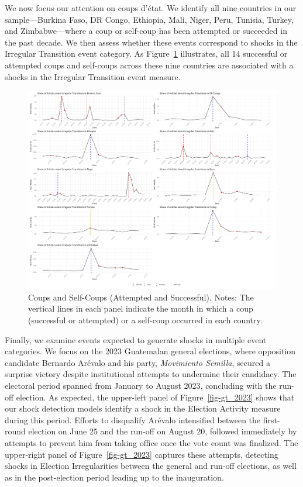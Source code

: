 \documentclass[
  letterpaper,
  DIV=11,
  numbers=noendperiod]{scrartcl}
\begin{document}
We now focus our attention on coups d'état. We identify all nine
countries in our sample---Burkina Faso, DR Congo, Ethiopia, Mali, Niger,
Peru, Tunisia, Turkey, and Zimbabwe---where a coup or self-coup has been
attempted or succeeded in the past decade. We then assess whether these
events correspond to shocks in the Irregular Transition event category.
As Figure~\ref{fig-coups_9} illustrates, all 14 successful or attempted
coups and self-coups across these nine countries are associated with a
shocks in the Irregular Transition event measure.

\begin{figure}

{\centering \includegraphics{event_validation/Combined_Coup_Plots.png}

}

\caption{\label{fig-coups_9}Coups and Self-Coups (Attempted and
Successful). Notes: The vertical lines in each panel indicate the month
in which a coup (successful or attempted) or a self-coup occurred in
each country.}

\end{figure}

Finally, we examine events expected to generate shocks in multiple event
categories. We focus on the 2023 Guatemalan general elections, where
opposition candidate Bernardo Arévalo and his party, \emph{Movimiento
Semilla}, secured a surprise victory despite institutional attempts to
undermine their candidacy. The electoral period spanned from January to
August 2023, concluding with the run-off election. As expected, the
upper-left panel of Figure~\ref{fig-gt_2023} shows that our shock
detection models identify a shock in the Election Activity measure
during this period. Efforts to disqualify Arévalo intensified between
the first-round election on June 25 and the run-off on August 20,
followed immediately by attempts to prevent him from taking office once
the vote count was finalized. The upper-right panel of
Figure~\ref{fig-gt_2023} captures these attempts, detecting shocks in
Election Irregularities between the general and run-off elections, as
well as in the post-election period leading up to the inauguration.
\end{document}
